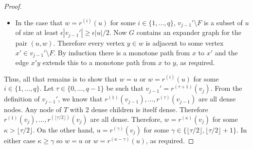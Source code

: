 \documentclass{patmorin}
\begin{document}
\begin{proof}
\begin{itemize}
    \item In the case that $w=r^{(i)}(u)$ for some $i\in\{1,\ldots,q\}$,
    $v_{j-1}'\setminus F$ is a subset of $u$ of size at least
    $\epsilon|v_{j-1}'| \ge \epsilon|u|/2$.  Now $G$ contains an expander
    graph for the pair $(u,w)$.  Therefore every vertex $y\in w$ is
    adjacent to some vertex $x'\in v_{j-1}'\setminus F$.  By induction there
    is a monotone path from $x$ to $x'$ and the edge $x'y$ extends this
    to a monotone path from $x$ to $y$, as required.
  \end{itemize}

  Thus, all that remains is to show that $w=u$ or $w=r^{(i)}(u)$ for
  some $i\in\{1,\ldots,q\}$.  Let $\tau\in\{0,\ldots,q-1\}$ be such that
  $v_{j-1}'=r^{(\tau+1)}(v_j)$.  From the definition of $v_{j-1}'$, we
  know that $r^{(1)}(v_{j-1}),\ldots,r^{(\tau)}(v_{j-1})$ are all dense
  nodes.  Any node of $T$ with 2 dense children is itself dense. Therefore
  $r^{(1)}(v_j),\ldots,r^{(\lfloor\tau/2\rfloor)}(v_j)$ are all dense.
  Therefore, $w=r^{(\kappa)}(v_j)$ for some $\kappa >
  \lfloor\tau/2\rfloor$.  On the other hand, $u=r^{(\gamma)}(v_j)$ for
  some $\gamma\in\{\lfloor\tau/2\rfloor,\lfloor\tau/2\rfloor+1\}$.
  In either case $\kappa \ge \gamma$ so $w=u$ or
  $w=r^{(\kappa-\gamma)}(u)$, as required.
\end{proof}

%
%
%
%
%



\end{document}

